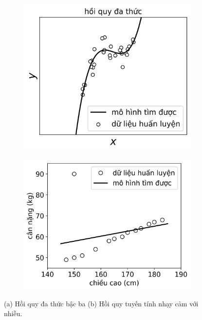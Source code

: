 \begin{figure}[t]
\begin{subfigure}{0.49\textwidth}
\includegraphics[width=0.99\linewidth]{Chapters/03_SimpleML/3_linearregression/polyreg.png}
\caption{}
\label{fig:3_lra}
\end{subfigure}
\begin{subfigure}{0.49\textwidth}
\includegraphics[width=0.99\linewidth]{ebookML_src/src/linear_regression/noise.png}
\caption{}
\label{fig:3_lrb}
\end{subfigure}
\caption{ (a) Hồi quy đa thức bậc ba (b) Hồi quy tuyến tính nhạy cảm với nhiễu.
}
\label{fig:3_lr}
\end{figure}



